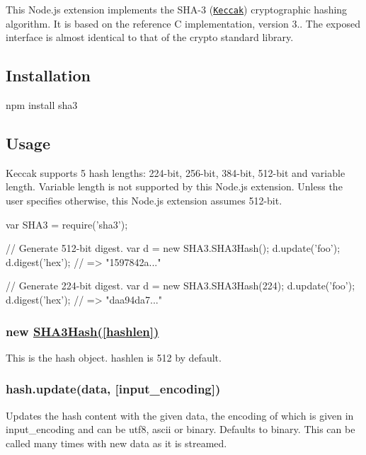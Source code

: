 This Node.\+js extension implements the S\+H\+A-\/3 (\href{http://keccak.noekeon.org/}{\tt Keccak}) cryptographic hashing algorithm. It is based on the reference C implementation, version 3.. The exposed interface is almost identical to that of the {\ttfamily crypto} standard library.

\href{https://travis-ci.org/phusion/node-sha3}{\tt }

\href{http://www.phusion.nl/}{\tt }

\subsection*{Installation}

\begin{DoxyVerb}npm install sha3
\end{DoxyVerb}


\subsection*{Usage}

Keccak supports 5 hash lengths\+: 224-\/bit, 256-\/bit, 384-\/bit, 512-\/bit and variable length. Variable length is not supported by this Node.\+js extension. Unless the user specifies otherwise, this Node.\+js extension assumes 512-\/bit. \begin{DoxyVerb}var SHA3 = require('sha3');

// Generate 512-bit digest.
var d = new SHA3.SHA3Hash();
d.update('foo');
d.digest('hex');   // => "1597842a..."

// Generate 224-bit digest.
var d = new SHA3.SHA3Hash(224);
d.update('foo');
d.digest('hex');   // => "daa94da7..."
\end{DoxyVerb}


\subsubsection*{new \hyperlink{class_s_h_a3_hash}{S\+H\+A3\+Hash(\mbox{[}hashlen\mbox{]})}}

This is the hash object. {\ttfamily hashlen} is 512 by default.

\subsubsection*{hash.\+update(data, \mbox{[}input\+\_\+encoding\mbox{]})}

Updates the hash content with the given data, the encoding of which is given in {\ttfamily input\+\_\+encoding} and can be {\ttfamily \textquotesingle{}utf8\textquotesingle{}}, {\ttfamily \textquotesingle{}ascii\textquotesingle{}} or {\ttfamily \textquotesingle{}binary\textquotesingle{}}. Defaults to {\ttfamily \textquotesingle{}binary\textquotesingle{}}. This can be called many times with new data as it is streamed.

